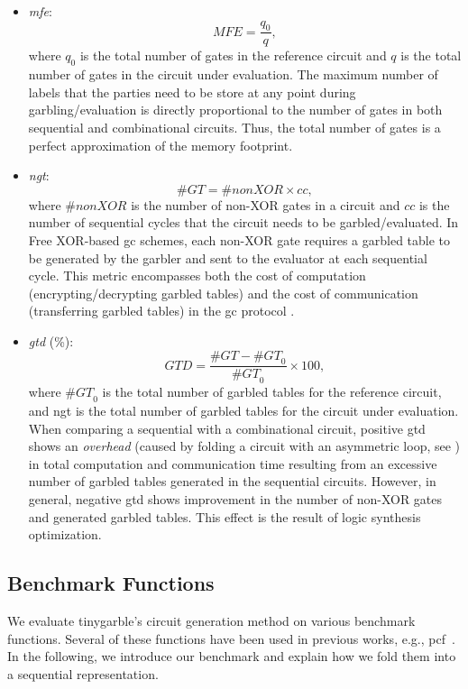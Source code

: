 \begin{itemize}
\item \textit{\acrfull{mfe}}: $$\mathit{MFE} = \dfrac{q_{0}}{q},$$ where $q_{0}$ is the total number of gates in the reference circuit and $q$ is the total number of gates in the circuit under evaluation.
		The maximum number of labels that the parties need to be store at any point during garbling/evaluation is directly proportional to the number of gates in both sequential and combinational circuits.
		Thus, the total number of gates is a perfect approximation of the memory footprint.

\item \textit{\acrfull{ngt}}: $$\mathit{\#GT} = \#nonXOR\times cc,$$ where $\#nonXOR$ is the number of non-XOR gates in a circuit and $cc$ is the number of sequential cycles that the circuit needs to be garbled/evaluated.
		In Free XOR-based \acrshort{gc} schemes, each non-XOR gate requires a garbled table to be generated by the garbler and sent to the evaluator at each sequential cycle.
		This metric encompasses both the cost of computation (encrypting/decrypting garbled tables) and the cost of communication (transferring garbled tables) in the \acrshort{gc} protocol \cite{kolesnikov2008improved}.

\item \textit{\acrfull{gtd}} (\%): $$\mathit{GTD} = \dfrac{\mathit{\#GT} - \mathit{\#GT}_{0}}{\mathit{\#GT}_{0}} \times 100,$$ where $\mathit{\#GT}_{0}$ is the total number of garbled tables for the reference circuit, and \acrshort{ngt} is the total number of garbled tables for the circuit under evaluation.
		When comparing a sequential with a combinational circuit, positive \acrshort{gtd} shows an \emph{overhead} (caused by folding a circuit with an asymmetric loop, see ) in total computation and communication time resulting from an excessive number of garbled tables generated in the sequential circuits.
		However, in general, negative \acrshort{gtd} shows improvement in the number of non-XOR gates and generated garbled tables.
		This effect is the result of logic synthesis optimization.
\end{itemize}

\subsection{Benchmark Functions}\label{ssec:eval-tinygarble-benchmark}
We evaluate \gls{tinygarble}'s circuit generation method on various benchmark functions.
Several of these functions have been used in previous works, e.g., \gls{pcf}~\cite{kreuter2013pcf}.
In the following, we introduce our benchmark and explain how we fold them into a sequential representation.

